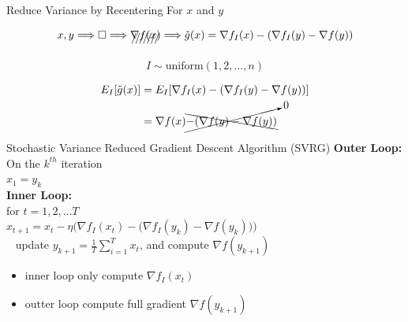 \documentclass[aspectratio=169,xcolor=dvipsnames]{beamer}
\begin{document}

\begin{frame}{Reduce Variance by Recentering}
	For $x$ and $y$
	
\begin{align*}
	x, y \Longrightarrow \Box \Longrightarrow \xout{\nabla f(x)} \Longrightarrow \tilde g(x) = \nabla f_I(x) - (\nabla f_I(y) - \nabla f(y))
\end{align*}

$$I \sim \text{uniform}(1, 2, \ldots, n)$$

\begin{align*}
	E_I[\tilde g(x)] & = E_I[\nabla f_I(x) - (\nabla f_I(y) - \nabla f(y))]\\
	& = \nabla f(x) \cancelto{0}{\bcancel{- (\nabla f(y) - \nabla f(y))}}
\end{align*}

	
\end{frame}




\begin{frame}{Stochastic Variance Reduced Gradient Descent Algorithm (SVRG)}
\textbf{Outer Loop:}\\
\hspace{1cm} On the $k^{th}$ iteration \\
\hspace{1cm} $x_1 = y_k$\\
\hspace{1cm} \textbf{Inner Loop:}\\
\hspace{2cm} for $t = 1,2,\ldots T$\\
\hspace{3cm} $x_{t+1} = x_t - \eta\Big( \nabla f_I(x_t) - \big(\nabla f_I(y_k) - \nabla f(y_k)\big) \Big)$\\
\
\hspace{2cm} update $y_{k+1} = \frac{1}{T}\sum_{i=1}^T x_t$, and compute $\nabla f(y_{k+1})$

\begin{itemize}
	\item inner loop only compute $\nabla f_I(x_t)$
	\item outter loop compute full gradient $\nabla f(y_{k+1})$
\end{itemize}

\end{frame}
\end{document}
